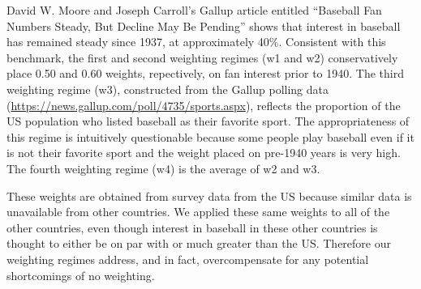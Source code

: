 \documentclass[11pt]{article}\usepackage[]{graphicx}\usepackage[]{color}
\begin{document}
David W. Moore and Joseph Carroll's Gallup article entitled 
``Baseball Fan Numbers Steady, But Decline May Be Pending'' shows that 
interest in baseball has remained steady since 1937, at approximately
40\%.  %
Consistent with this benchmark, the first and second weighting regimes 
(w1 and w2) conservatively place 0.50 and 0.60 weights, repectively, 
on fan interest prior to 1940.  %
The third weighting regime (w3), constructed from the Gallup polling data 
(\url{https://news.gallup.com/poll/4735/sports.aspx}), 
reflects the proportion of the US population who 
listed baseball as their favorite sport.  
The appropriateness of this regime is intuitively questionable because 
some people play baseball even if it is not their favorite sport and the 
weight placed on pre-1940 years is very high.  
The fourth weighting regime (w4) is the average of w2 and w3.  





These weights are obtained from survey data from the US because similar data 
is unavailable from other countries.
We applied these same 
weights to all of the other countries, even though interest in baseball in 
these other countries is thought to either be on par with or much greater 
than the US.  Therefore our weighting regimes address, and in fact, 
overcompensate for any potential shortcomings of no weighting.
\end{document}
